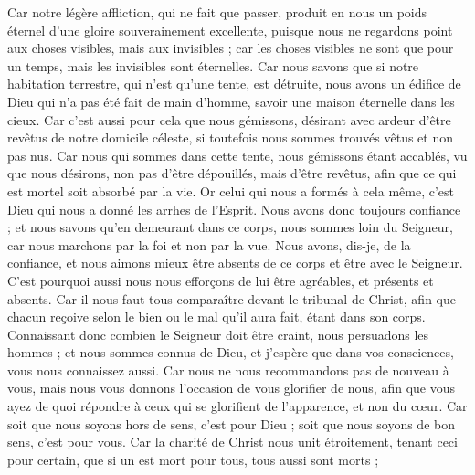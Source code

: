\begin{multicols}{2}
Car notre légère affliction, qui ne fait que passer, produit en nous un poids éternel d'une gloire souverainement excellente,
puisque nous ne regardons point aux choses visibles, mais aux invisibles ; car les choses visibles ne sont que pour un temps, mais les invisibles sont éternelles.
\VerseOne{}Car nous savons que si notre habitation terrestre, qui n'est qu'une tente, est détruite, nous avons un édifice de Dieu qui n'a pas été fait de main d'homme, savoir une maison éternelle dans les cieux.
Car c'est aussi pour cela que nous gémissons, désirant avec ardeur d'être revêtus de notre domicile céleste,
si toutefois nous sommes trouvés vêtus et non pas nus.
Car nous qui sommes dans cette tente, nous gémissons étant accablés, vu que nous désirons, non pas d'être dépouillés, mais d'être revêtus, afin que ce qui est mortel soit absorbé par la vie.
Or celui qui nous a formés à cela même, c'est Dieu qui nous a donné les arrhes de l'Esprit.
Nous avons donc toujours confiance ; et nous savons qu'en demeurant dans ce corps, nous sommes loin du Seigneur,
car nous marchons par la foi et non par la vue.
Nous avons, dis-je, de la confiance, et nous aimons mieux être absents de ce corps et être avec le Seigneur.
C'est pourquoi aussi nous nous efforçons de lui être agréables, et présents et absents.
Car il nous faut tous comparaître devant le tribunal de Christ, afin que chacun reçoive selon le bien ou le mal qu'il aura fait, étant dans son corps.
Connaissant donc combien le Seigneur doit être craint, nous persuadons les hommes ; et nous sommes connus de Dieu, et j'espère que dans vos consciences, vous nous connaissez aussi.
Car nous ne nous recommandons pas de nouveau à vous, mais nous vous donnons l'occasion de vous glorifier de nous, afin que vous ayez de quoi répondre à ceux qui se glorifient de l'apparence, et non du cœur.
Car soit que nous soyons hors de sens, c'est pour Dieu ; soit que nous soyons de bon sens, c'est pour vous.
Car la charité de Christ nous unit étroitement, tenant ceci pour certain, que si un est mort pour tous, tous aussi sont morts ;

\end{multicols}

